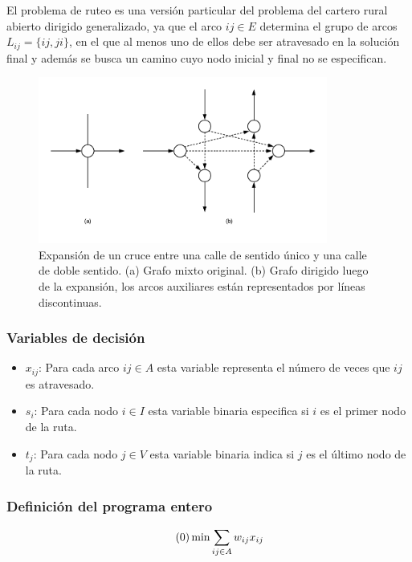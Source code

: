 \documentclass[conference]{IEEEtran}
\begin{document}
El problema de ruteo es una versión particular del problema del cartero rural abierto dirigido generalizado, ya que el arco $i j \in E $ determina el grupo de arcos $L_{i j} = \{i j, j i\}$, en el que al menos uno de ellos debe ser atravesado en la solución final y además se busca un camino cuyo nodo inicial y final no se especifican.

\begin{figure}[tbp]
\centerline{\includegraphics[width=9.5cm]{imagenes/expanded_graph.png}}
\caption{Expansión de un cruce entre una calle de sentido único y una calle de doble sentido. (a) Grafo mixto original. (b) Grafo dirigido luego de la expansión, los arcos auxiliares están representados por líneas discontinuas. \cite{Braier2017AnArgentina}}
\label{fig:grafo_expandido}
\end{figure}

\subsubsection{Variables de decisión}
\begin{itemize}
\item $x_{i j}$: Para cada arco $ {i j} \in A$ esta variable representa el número de veces que $i j$ es atravesado.

\item $s_i$: Para cada nodo $i \in I$ esta variable binaria especifica si  $i$ es el primer nodo de la ruta.

\item $t_j$: Para cada nodo $j \in V$ esta variable binaria indica si $j$ es el último nodo de la ruta.
\end{itemize}

\subsubsection{Definición del programa entero}
\label{sec:programa-entero}
\begin{equation} \tag{0} \label{eq0}
\min \sum_{i j \in A} w_{i j} x_{i j}  \\
\end{equation} 
\hbox{}
\end{document}
